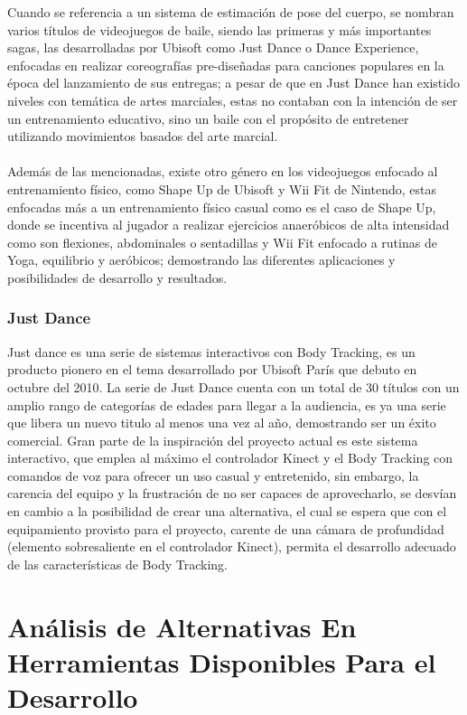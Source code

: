 Cuando se referencia a un sistema de estimación de pose del cuerpo, se nombran varios títulos de videojuegos de baile, siendo las primeras y más importantes sagas, las desarrolladas por Ubisoft como Just Dance o Dance Experience, enfocadas en realizar coreografías pre-diseñadas para canciones populares en la época del lanzamiento de sus entregas; a pesar de que en Just Dance han existido niveles con temática de artes marciales, estas no contaban con la intención de ser un entrenamiento educativo, sino un baile con el propósito de entretener utilizando movimientos basados del arte marcial.  \\
\\
Además de las mencionadas, existe otro género en los videojuegos enfocado al entrenamiento físico, como Shape Up de Ubisoft y Wii Fit de Nintendo, estas enfocadas más a un entrenamiento físico casual como es el caso de Shape Up, donde se incentiva al jugador a realizar ejercicios anaeróbicos de alta intensidad como son flexiones, abdominales o sentadillas y Wii Fit enfocado a rutinas de Yoga, equilibrio y aeróbicos; demostrando las diferentes aplicaciones y posibilidades de desarrollo y resultados. \\

\subsubsection{Just Dance}

Just dance es una serie de sistemas interactivos con Body Tracking, es un producto pionero en el tema desarrollado por Ubisoft París que debuto en octubre del 2010. La serie de Just Dance cuenta con un total de 30 títulos con un amplio rango de categorías de edades para llegar a la audiencia, es ya una serie que libera un nuevo titulo al menos una vez al año, demostrando ser un éxito comercial. Gran parte de la inspiración del proyecto actual es este sistema interactivo, que emplea al máximo el controlador Kinect y el Body Tracking con comandos de voz para ofrecer un uso casual y entretenido, sin embargo, la carencia del equipo y la frustración de no ser capaces de aprovecharlo, se desvían en cambio a la posibilidad de crear una alternativa, el cual se espera que con el equipamiento provisto para el proyecto, carente de una cámara de profundidad (elemento sobresaliente en el controlador Kinect), permita el desarrollo adecuado de las características de Body Tracking.


\section{Análisis de Alternativas En Herramientas Disponibles Para el Desarrollo}


